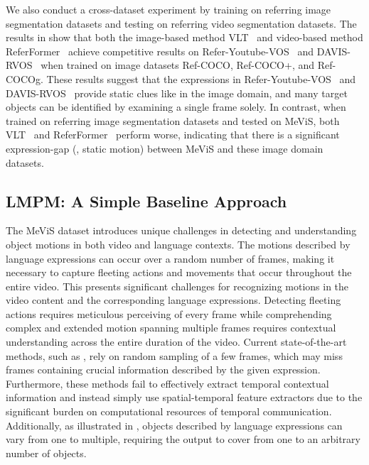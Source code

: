 \documentclass[10pt,twocolumn,letterpaper]{article}
\newcommand{\ourdataset}{MeViS\xspace}
\newcommand{\ourmodel}{LMPM\xspace}
\begin{document}
We also conduct a cross-dataset experiment by training on referring image segmentation datasets and testing on referring video segmentation datasets. The results in  show that both the image-based method VLT~\cite{vltpami} and video-based method ReferFormer~\cite{wu2022referformer} achieve competitive results on Refer-Youtube-VOS~\cite{seo2020urvos} and DAVIS-RVOS~\cite{khoreva2018video} when trained on image datasets Ref-COCO, Ref-COCO+, and Ref-COCOg. These results suggest that the expressions in Refer-Youtube-VOS~\cite{seo2020urvos} and DAVIS-RVOS~\cite{khoreva2018video} provide static clues like in the image domain, and many target objects can be identified by examining a single frame solely. In contrast, when trained on referring image segmentation datasets and tested on \ourdataset, both VLT~\cite{vltpami} and ReferFormer~\cite{wu2022referformer} perform worse, indicating that there is a significant expression-gap (\eg, static \vs motion) between \ourdataset and these image domain datasets.


\subsection{\ourmodel: A Simple Baseline Approach}\label{sec:L-TAM}

The \ourdataset dataset introduces unique challenges in detecting and understanding object motions in both video and language contexts. The motions described by language expressions can occur over a random number of frames, making it necessary to capture fleeting actions and movements that occur throughout the entire video. This presents significant challenges for recognizing motions in the video content and the corresponding language expressions. Detecting fleeting actions requires meticulous perceiving of every frame while comprehending complex and extended motion spanning multiple frames requires contextual understanding across the entire duration of the video. Current state-of-the-art methods, such as \cite{wu2022referformer,MTTR,Ding_2022_CVPR}, rely on random sampling of a few frames, which may miss frames containing crucial information described by the given expression. Furthermore, these methods fail to effectively extract temporal contextual information and instead simply use spatial-temporal feature extractors due to the significant burden on computational resources of temporal communication. Additionally, as illustrated in , objects described by language expressions can vary from one to multiple, requiring the output to cover from one to an arbitrary number of objects.
\end{document}
